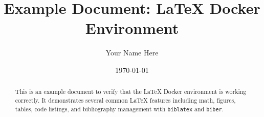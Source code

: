 \documentclass[12pt,a4paper]{article}
\title{Example Document: LaTeX Docker Environment}
\author{Your Name Here}
\date{\today}
\begin{document}
\maketitle

\begin{abstract}
    This is an example document to verify that the LaTeX Docker environment
    is working correctly. It demonstrates several common LaTeX features
    including math, figures, tables, code listings, and bibliography
    management with \texttt{biblatex} and \texttt{biber}.
\end{abstract}

\tableofcontents
\newpage






\newpage
\printbibliography
\end{document}
